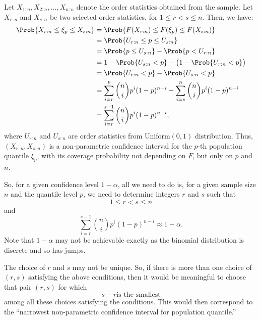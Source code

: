 Let $ X_{1:n},X_{2:n},\ldots,X_{n:n} $ denote the order statistics obtained
from the sample. Let $ X_{r:n} $ and $ X_{s:n} $
be two selected order statistics, for $ 1\le r<s\le n $. Then, we have:
\begin{align*}
    \Prob{X_{r:n}\le \xi_p\le X_{s:n}}
     & =\Prob{F(X_{r:n})\le F(\xi_p)\le F(X_{s:n})}                                         \\
     & =\Prob{U_{r:n}\le p\le U_{s:n}}                                                      \\
     & =\Prob{p\le U_{s:n}}-\Prob{p<U_{r:n}}                                                \\
     & =1-\Prob{U_{s:n}<p}-\bigl(1-\Prob{U_{r:n}<p}\bigr)                                   \\
     & =\Prob{U_{r:n}<p}-\Prob{U_{s:n}<p}                                                   \\
     & =\sum_{i=r}^{p}\binom{n}{i}p^i (1-p)^{n-i}-\sum_{i=s}^{n}\binom{n}{i}p^i (1-p)^{n-i} \\
     & =\sum_{i=r}^{s-1}\binom{n}{i}p^i (1-p)^{n-i},
\end{align*}
where $ U_{r:n} $ and $ U_{s:n} $ are order statistics from $ \text{Uniform}(0,1) $ distribution.
Thus, $ (X_{r:n},X_{s:n}) $ is a non-parametric confidence interval for the $ p $-th
population quantile $ \xi_p $, with its coverage probability not
depending on $ F $, but only on $ p $ and $ n $.

So, for a given confidence level $ 1-\alpha $,
all we need to do is, for a given sample size $ n $ and the quantile
level $ p $, we need to determine integers $ r $ and $ s $ such that
\[ 1\le r<s\le n \]
and
\[ \sum_{i=r}^{s-1}\binom{n}{i}p^i (1-p)^{n-i}\approx 1-\alpha. \]
Note that $ 1-\alpha $ may not be achievable exactly as the binomial
distribution is discrete and so has jumps.
\begin{Remark}{}{}
    The choice of $ r $ and $ s $ may not be unique. So,
    if there is more than one choice of $ (r,s) $ satisfying
    the above conditions, then it would be meaningful to choose
    that pair $ (r,s) $ for which
    \[ s-r\text{is the smallest} \]
    among all these choices satisfying the conditions. This would then correspond
    to the ``narrowest non-parametric confidence interval for population quantile.''
\end{Remark}